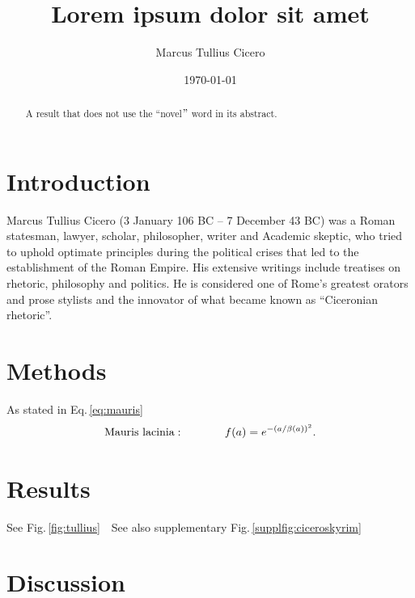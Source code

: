 \documentclass[fleqn]{scrartcl}%
\title{Lorem ipsum dolor sit amet}%
\author{Marcus Tullius Cicero}%
\date{\today}%
\begin{document}
    \maketitle
    \begin{abstract}
        A result that does not use the ``novel\("\) word in its abstract.
    \end{abstract}


    \clearpage
    \section*{Introduction}
    Marcus Tullius Cicero (3 January 106 BC – 7 December 43 BC) was a Roman statesman, lawyer, scholar, philosopher,
    writer and Academic skeptic, who tried to uphold optimate principles during the political crises that led to the
    establishment of the Roman Empire.\cite{abalem2018double}
    His extensive writings include treatises on rhetoric, philosophy and politics.
    He is considered one of Rome's greatest orators and prose stylists
    and the innovator of what became known as ``Ciceronian rhetoric''.

    \clearpage
    \section*{Methods}
    As stated in Eq.\,\ref{eq:mauris}
    \newline
    \blindtext
    \begin{align}\label{eq:mauris}
        \textnormal{Mauris lacinia}: \hspace{0.5in}	 f(a) = e^{-(a/\beta(a))^2}.
    \end{align}



    \clearpage
    \section*{Results}
    See Fig.\,\ref{fig:tullius}
    \newline
    \blindtext\,\
    See also supplementary Fig.\,\ref{supplfig:ciceroskyrim}


    \clearpage
    \section*{Discussion}
    \blindtext
\end{document}
